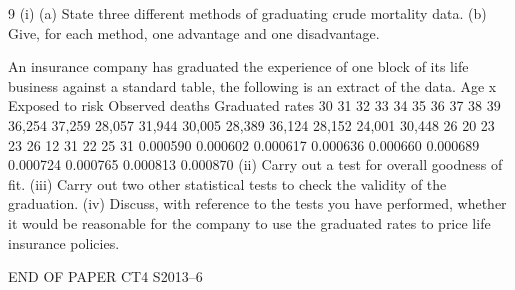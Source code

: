 \documentclass[a4paper,12pt]{article}
\begin{document}
\begin{enumerate}

9
(i)
(a) State three different methods of graduating crude mortality data.
(b) Give, for each method, one advantage and one disadvantage.

An insurance company has graduated the experience of one block of its life business
against a standard table, the following is an extract of the data.
Age x Exposed to
risk Observed
deaths Graduated
rates
30
31
32
33
34
35
36
37
38
39 36,254
37,259
28,057
31,944
30,005
28,389
36,124
28,152
24,001
30,448 26
20
23
23
26
12
31
22
25
31 0.000590
0.000602
0.000617
0.000636
0.000660
0.000689
0.000724
0.000765
0.000813
0.000870
(ii) Carry out a test for overall goodness of fit.
(iii) Carry out two other statistical tests to check the validity of the graduation. 
(iv) Discuss, with reference to the tests you have performed, whether it would be
reasonable for the company to use the graduated rates to price life insurance
policies.

END OF PAPER
CT4 S2013–6




\end{enumerate}
\end{document}
